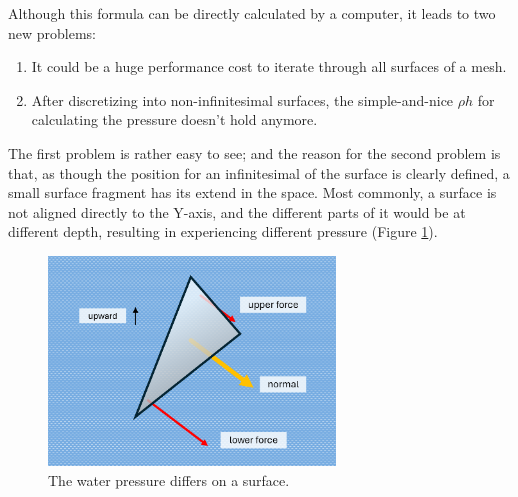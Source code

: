 Although this formula can be directly calculated by a computer, it leads to two new problems:
\begin{enumerate}
	\item It could be a huge performance cost to iterate through all surfaces of a mesh.
	\item After discretizing into non-infinitesimal surfaces, the simple-and-nice $\rho h$ for calculating the pressure doesn't hold anymore.
\end{enumerate}

The first problem is rather easy to see;
and the reason for the second problem is that, as though the position for an infinitesimal of the surface is clearly defined, a small surface fragment has its extend in the space.
Most commonly, a surface is not aligned directly to the Y-axis, and the different parts of it would be at different depth, resulting in experiencing different pressure (Figure \ref{water-pressure-differs-on-surface}).

\begin{figure}[h]
	\begin{center}
		\includegraphics[width=3in]{figures/water-pressure-on-small-surface.png}
	\end{center}
	\caption{The water pressure differs on a surface.}
	\label{water-pressure-differs-on-surface}
\end{figure}